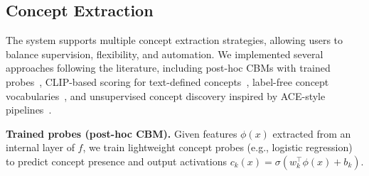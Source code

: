 \documentclass[sigconf,review,screen]{acmart}
\begin{document}


\subsection{Concept Extraction}
The system supports multiple concept extraction strategies, allowing users to balance supervision, flexibility, and automation. 
We implemented several approaches following the literature, including post-hoc CBMs with trained probes~\cite{Yuksekgonul2022PCBM}, CLIP-based scoring for text-defined concepts~\cite{radford_learning_2021}, label-free concept vocabularies~\cite{oikarinen_label-free_2022}, and unsupervised concept discovery inspired by ACE-style pipelines~\cite{Ghorbani2019ACE}.

\noindent\textbf{Trained probes (post-hoc CBM).}
Given features $\phi(x)$ extracted from an internal layer of $f$, we train lightweight concept probes (e.g., logistic regression) to predict concept presence and output activations $c_k(x)=\sigma(w_k^\top\phi(x)+b_k)$.
\end{document}
